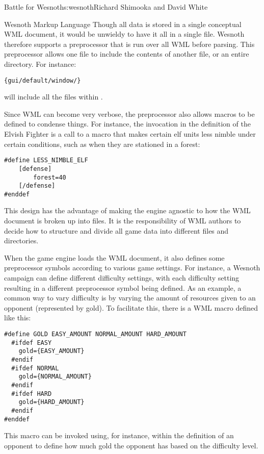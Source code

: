 \begin{aosachapter}{Battle for Wesnoth}{s:wesnoth}{Richard Shimooka and David White}
\begin{aosasect1}{Wesnoth Markup Language}
Though all data is stored in a single conceptual WML
document, it would be unwieldy to have it all in a single file.
Wesnoth therefore supports a preprocessor that is run over all WML
before parsing. This preprocessor allows one file to include the
contents of another file, or an entire directory. For instance:

\begin{verbatim}
{gui/default/window/}
\end{verbatim}

\noindent
will include all the  files within .

Since WML can become very verbose, the preprocessor also allows
macros to be defined to condense things. For instance, the
 invocation in the definition of the
Elvish Fighter is a call to a macro that makes certain elf units less
nimble under certain conditions, such as when they are stationed in a
forest:

\begin{verbatim}
#define LESS_NIMBLE_ELF
    [defense]
        forest=40
    [/defense]
#enddef
\end{verbatim}

This design has the advantage of making the engine agnostic to how the
WML document is broken up into files. It is the responsibility of WML
authors to decide how to structure and divide all game data into
different files and directories.

When the game engine loads the WML document, it also defines some
preprocessor symbols according to various game settings.  For
instance, a Wesnoth campaign can define different difficulty settings,
with each difficulty setting resulting in a different preprocessor
symbol being defined. As an example, a common way to vary difficulty
is by varying the amount of resources given to an opponent
(represented by gold). To facilitate this, there is a WML macro
defined like this:

\begin{verbatim}
#define GOLD EASY_AMOUNT NORMAL_AMOUNT HARD_AMOUNT
  #ifdef EASY
    gold={EASY_AMOUNT}
  #endif
  #ifdef NORMAL
    gold={NORMAL_AMOUNT}
  #endif
  #ifdef HARD
    gold={HARD_AMOUNT}
  #endif
#enddef
\end{verbatim}

\noindent This macro can be invoked using, for instance,  within the definition of an opponent to define how much gold
the opponent has based on the difficulty level.


\end{aosasect1}
\end{aosachapter}
